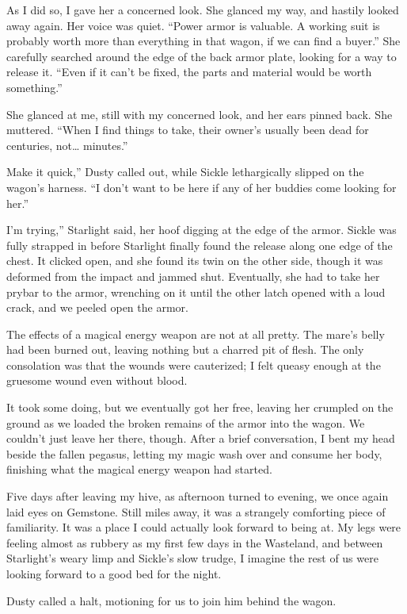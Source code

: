 As I did so, I gave her a concerned look. She glanced my way, and hastily looked away again. Her voice was quiet. “Power armor is valuable. A working suit is probably worth more than everything in that wagon, if we can find a buyer.” She carefully searched around the edge of the back armor plate, looking for a way to release it. “Even if it can’t be fixed, the parts and material would be worth something.”

She glanced at me, still with my concerned look, and her ears pinned back. She muttered. “When I find things to take, their owner’s usually been dead for centuries, not… minutes.”

\leavevmode{}Make it quick,” Dusty called out, while Sickle lethargically slipped on the wagon’s harness. “I don’t want to be here if any of her buddies come looking for her.”

\leavevmode{}I’m trying,” Starlight said, her hoof digging at the edge of the armor. Sickle was fully strapped in before Starlight finally found the release along one edge of the chest. It clicked open, and she found its twin on the other side, though it was deformed from the impact and jammed shut. Eventually, she had to take her prybar to the armor, wrenching on it until the other latch opened with a loud crack, and we peeled open the armor.

The effects of a magical energy weapon are not at all pretty. The mare’s belly had been burned out, leaving nothing but a charred pit of flesh. The only consolation was that the wounds were cauterized; I felt queasy enough at the gruesome wound even without blood.

It took some doing, but we eventually got her free, leaving her crumpled on the ground as we loaded the broken remains of the armor into the wagon. We couldn’t just leave her there, though. After a brief conversation, I bent my head beside the fallen pegasus, letting my magic wash over and consume her body, finishing what the magical energy weapon had started.

{\br}%
Five days after leaving my hive, as afternoon turned to evening, we once again laid eyes on Gemstone. Still miles away, it was a strangely comforting piece of familiarity. It was a place I could actually look forward to being at. My legs were feeling almost as rubbery as my first few days in the Wasteland, and between Starlight’s weary limp and Sickle’s slow trudge, I imagine the rest of us were looking forward to a good bed for the night.

Dusty called a halt, motioning for us to join him behind the wagon.

